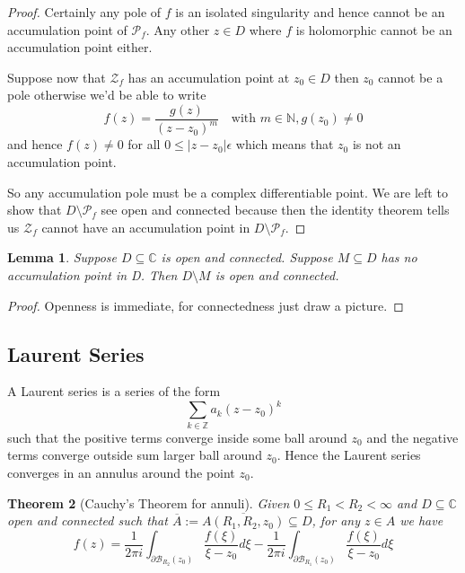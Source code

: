 \documentclass[11pt]{article}
\newcommand{\defeq}{:=}
\newcommand{\abs}[1]{\left|#1\right|}
\newcommand{\C}{\mathbb{C}}
\newcommand{\Z}{\mathbb{Z}}
\newcommand{\N}{\mathbb{N}}
\newenvironment{defin}
	{\begin{mdframed}[backgroundcolor=white, roundcorner=5pt, linewidth=1pt]}
	{\end{mdframed}}
\newcommand{\mdf}[1]{{\color{red} #1}}
\newtheorem{theorem}{Theorem}[section]
\newtheorem{lemma}[theorem]{Lemma}
\begin{document}
\begin{proof}
Certainly any pole of $f$ is an isolated singularity and hence cannot be an accumulation point of $\mathcal{P}_f$.
Any other $z\in D$ where $f$ is holomorphic cannot be an accumulation point either.

Suppose now that $\mathcal{Z}_f$ has an accumulation point at $z_0\in D$ then $z_0$ cannot be a pole otherwise we'd be able to write
\[
	f(z)=\frac{g(z)}{(z-z_0)^m}\quad\text{with }m\in\N, g(z_0)\neq 0
\]
and hence $f(z)\neq 0$ for all $0\leq\abs{z-z_0}\epsilon$ which means that $z_0$ is not an accumulation point.

So any accumulation pole must be a complex differentiable point.
We are left to show that $D\setminus\mathcal{P}_f$ see open and connected because then the identity theorem tells us $\mathcal{Z}_f$ cannot have an accumulation point in $D\setminus\mathcal{P}_f$.
\end{proof}

\begin{lemma}
Suppose $D\subseteq\C$ is open and connected.
Suppose $M\subseteq D$ has no accumulation point in D.
Then $D\setminus M$ is open and connected.
\end{lemma}

\begin{proof}
Openness is immediate, for connectedness just draw a picture.
\end{proof}

\subsection{Laurent Series}
\begin{defin}
	A \mdf{Laurent series} is a series of the form
	\[
		\sum_{k\in\Z}a_k(z-z_0)^k
	\]
	such that the positive terms converge inside some ball around $z_0$ and the negative terms converge outside sum larger ball around $z_0$.
	Hence the Laurent series converges in an annulus around the point $z_0$.
\end{defin}

\begin{theorem}[Cauchy's Theorem for annuli]
Given $0\leq R_1 < R_2 < \infty$ and $D\subseteq\C$ open and connected such that $\overline{A}\defeq\overline{A(R_1, R_2, z_0)}\subseteq D$, for any $z\in A$ we have
\[
	f(z) = \frac{1}{2\pi i}\int_{\partial \mathcal{B}_{R_2}(z_0)}\frac{f(\xi)}{\xi-z_0}d\xi - \frac{1}{2\pi i}\int_{\partial \mathcal{B}_{R_1}(z_0)}\frac{f(\xi)}{\xi-z_0}d\xi
\]
\end{theorem}
\end{document}
